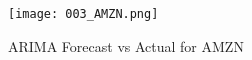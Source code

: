 \documentclass{article}
\begin{document}
\begin{figure}[h]
\centering
\texttt{[image: 003\_AMZN.png]}
\caption{ARIMA Forecast vs Actual for AMZN}
\label{fig:AMZN_forecast}
\end{figure}
\end{document}
